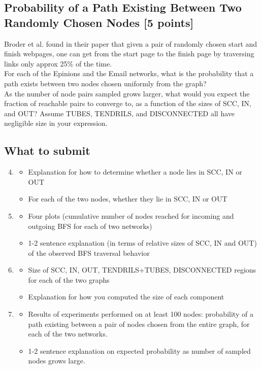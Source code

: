 \subsection{Probability of a Path Existing Between Two Randomly Chosen Nodes [5 points]}
Broder et al. found in their paper that given a pair of randomly chosen start and finish webpages, one can get from the start page to the finish page by traversing links only approx 25\% of the time. \\
For each of the Epinions and the Email networks, what is the probability that a path exists between two nodes chosen uniformly from the graph? \\
As the number of node pairs sampled grows larger, what would you expect the fraction of reachable pairs to converge to, as a function of the sizes of SCC, IN, and OUT? Assume TUBES, TENDRILS, and DISCONNECTED all have negligible size in your expression.


\subsection*{What to submit}
\begin{enumerate}[{Page} 1:]
\setcounter{enumi}{3}
\item 
\begin{itemize}
\item Explanation for how to determine whether a node lies in SCC, IN or OUT
\item For each of the two nodes, whether they lie in SCC, IN or OUT
\end{itemize}

\item
\begin{itemize}
\item Four plots (cumulative number of nodes reached for incoming and outgoing BFS for each of two networks)
\item 1-2 sentence explanation (in terms of relative sizes of SCC, IN and OUT) of the observed BFS traversal behavior
\end{itemize}

\item
\begin{itemize}
\item Size of SCC, IN, OUT, TENDRILS+TUBES, DISCONNECTED regions for each of the two graphs
\item Explanation for how you computed the size of each component
\end{itemize}

\item 
\begin{itemize}
\item Results of experiments performed on at least 100 nodes: probability of a path existing between a pair of nodes chosen from the entire graph, for each of the two networks.
\item 1-2 sentence explanation on expected probability as number of sampled nodes grows large.
\end{itemize}
\end{enumerate}
